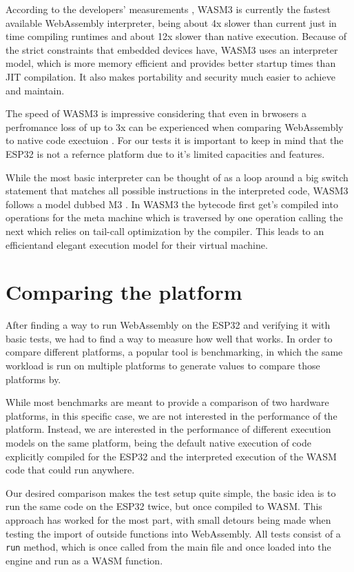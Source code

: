 According to the developers' measurements \autocite{shymanskyy_wasm3_2020}, WASM3 is currently the fastest available WebAssembly interpreter, being about 4x slower than current just in time compiling runtimes and about 12x slower than native execution. Because of the strict constraints that embedded devices have, WASM3 uses an interpreter model, which is more memory efficient and provides better startup times than JIT compilation. It also makes portability and security much easier to achieve and maintain.

The speed of WASM3 is impressive considering that even in brwosers a perfromance loss of up to 3x can be experienced when comparing WebAssembly to native code exectuion \autocite{jangda_not_2019}. For our tests it is important to keep in mind that the ESP32 is not a refernce platform due to it's limited capacities and features.

While the most basic interpreter can be thought of as a loop around a big switch statement that matches all possible instructions in the interpreted code, WASM3 follows a model dubbed M3 \autocite{shymanskyy_wasm3interpreter_nodate}. In WASM3 the bytecode first get's compiled into operations for the meta machine which is traversed by one operation calling the next which relies on tail-call optimization by the compiler. This leads to an efficientand elegant execution model for their virtual machine.

\section{Comparing the platform}
After finding a way to run WebAssembly on the ESP32 and verifying it with basic tests, we had to find a way to measure how well that works. In order to compare different platforms, a popular tool is benchmarking, in which the same workload is run on multiple platforms to generate values to compare those platforms by.

While most benchmarks are meant to provide a comparison of two hardware platforms, in this specific case, we are not interested in the performance of the platform. Instead, we are interested in the performance of different execution models on the same platform, being the default native execution of code explicitly compiled for the ESP32 and the interpreted execution of the WASM code that could run anywhere.

Our desired comparison makes the test setup quite simple, the basic idea is to run the same code on the ESP32 twice, but once compiled to WASM. This approach has worked for the most part, with small detours being made when testing the import of outside functions into WebAssembly. All tests consist of a \lstinline{run} method, which is once called from the main file and once loaded into the engine and run as a WASM function.

